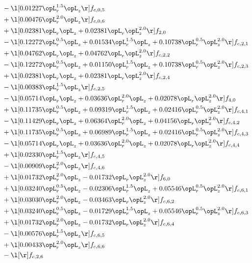 \begin{alignat}{2}
& - \l[  0.01227 \opL_r^{1.5} \opL_z  \r] f_{c,0,5} \nonumber \\ 
& + \l[  0.00476 \opL_r^{2.0} \opL_z  \r] f_{c,0,6} \nonumber \\ 
& + \l[  0.02381 \opL_r \opL_z +  0.02381 \opL_r \opL_z^{2.0}  \r] f_{2,0} \nonumber \\ 
& - \l[  0.12272 \opL_r^{0.5} \opL_z +  0.01534 \opL_r^{1.5} \opL_z +  0.10738 \opL_r^{0.5} \opL_z^{2.0}  \r] f_{c,2,1} \nonumber \\ 
& + \l[  0.04762 \opL_r \opL_z +  0.04762 \opL_r \opL_z^{2.0}  \r] f_{c,2,2} \nonumber \\ 
& - \l[  0.12272 \opL_r^{0.5} \opL_z +  0.01150 \opL_r^{1.5} \opL_z +  0.10738 \opL_r^{0.5} \opL_z^{2.0}  \r] f_{c,2,3} \nonumber \\ 
& + \l[  0.02381 \opL_r \opL_z +  0.02381 \opL_r \opL_z^{2.0}  \r] f_{c,2,4} \nonumber \\ 
& - \l[  0.00383 \opL_r^{1.5} \opL_z  \r] f_{c,2,5} \nonumber \\ 
& - \l[  0.05714 \opL_r \opL_z +  0.03636 \opL_r^{2.0} \opL_z +  0.02078 \opL_r \opL_z^{2.0}  \r] f_{4,0} \nonumber \\ 
& + \l[  0.11735 \opL_r^{0.5} \opL_z +  0.09319 \opL_r^{1.5} \opL_z +  0.02416 \opL_r^{0.5} \opL_z^{2.0}  \r] f_{c,4,1} \nonumber \\ 
& - \l[  0.11429 \opL_r \opL_z +  0.06364 \opL_r^{2.0} \opL_z +  0.04156 \opL_r \opL_z^{2.0}  \r] f_{c,4,2} \nonumber \\ 
& + \l[  0.11735 \opL_r^{0.5} \opL_z +  0.06989 \opL_r^{1.5} \opL_z +  0.02416 \opL_r^{0.5} \opL_z^{2.0}  \r] f_{c,4,3} \nonumber \\ 
& - \l[  0.05714 \opL_r \opL_z +  0.03636 \opL_r^{2.0} \opL_z +  0.02078 \opL_r \opL_z^{2.0}  \r] f_{c,4,4} \nonumber \\ 
& + \l[  0.02330 \opL_r^{1.5} \opL_z  \r] f_{c,4,5} \nonumber \\ 
& - \l[  0.00909 \opL_r^{2.0} \opL_z  \r] f_{c,4,6} \nonumber \\ 
& + \l[  0.01732 \opL_r^{2.0} \opL_z   -0.01732 \opL_r \opL_z^{2.0}  \r] f_{6,0} \nonumber \\ 
& + \l[  0.03240 \opL_r^{0.5} \opL_z   -0.02306 \opL_r^{1.5} \opL_z +  0.05546 \opL_r^{0.5} \opL_z^{2.0}  \r] f_{c,6,1} \nonumber \\ 
& + \l[  0.03030 \opL_r^{2.0} \opL_z   -0.03463 \opL_r \opL_z^{2.0}  \r] f_{c,6,2} \nonumber \\ 
& + \l[  0.03240 \opL_r^{0.5} \opL_z   -0.01729 \opL_r^{1.5} \opL_z +  0.05546 \opL_r^{0.5} \opL_z^{2.0}  \r] f_{c,6,3} \nonumber \\ 
& + \l[  0.01732 \opL_r^{2.0} \opL_z   -0.01732 \opL_r \opL_z^{2.0}  \r] f_{c,6,4} \nonumber \\ 
& - \l[  0.00576 \opL_r^{1.5} \opL_z  \r] f_{c,6,5} \nonumber \\ 
& + \l[  0.00433 \opL_r^{2.0} \opL_z  \r] f_{c,6,6} \nonumber \\ 
& - \l[  \r] f_{c,2,6} \nonumber \\ 
\end{alignat} 


